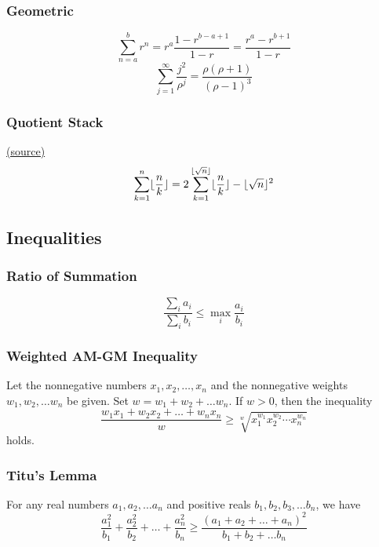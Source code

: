 \documentclass[10pt]{article}
\begin{document}
\subsubsection{Geometric}
\begin{equation}
    \sum_{n=a}^b r^n = r^a \frac{1-r^{b-a+1}}{1-r} = \frac{r^a - r^{b+1}}{1-r}
\end{equation}
\begin{equation}
    \sum_{j=1}^{\infty} \frac{j^2}{\rho^j} = \frac{\rho (\rho+1)}{(\rho-1)^3}
\end{equation}

\subsubsection{Quotient Stack}
\href{https://math.stackexchange.com/questions/384520/efficient-computation-of-sum-k-1n-left-lfloor-fracnk-right-rfloor}{(source)}
\begin{equation}
    \sum_{k=1}^n \lfloor \frac{n}{k} \rfloor = 2 \sum_{k=1}^{\lfloor \sqrt{n} \rfloor} \lfloor \frac{n}{k} \rfloor - \lfloor \sqrt{n} \rfloor^2    
\end{equation}

\subsection{Inequalities}
\subsubsection{Ratio of Summation}
\begin{equation}
    \frac{\sum_i a_i}{\sum_i b_i} \leq \max_i \frac{a_i}{b_i}
\end{equation}

\subsubsection{Weighted AM-GM Inequality}
Let the nonnegative numbers $x_1, x_2, \dots, x_n$ and the nonnegative weights $w_1, w_2, \dots w_n$ be given. Set $w = w_1 + w_2 + \dots w_n$. If $w>0$, then the inequality 
\begin{equation}
    \frac{w_1 x_1 +w_2 x_2 + \dots + w_n x_n}{w} \geq \sqrt[w]{x_1^{w_1}x_2^{w_2} \cdots x_n^{w_n}}
\end{equation}
holds.

\subsubsection{Titu's Lemma}
 For any real numbers $a_1, a_2, \dots a_n$ and positive reals $b_1, b_2, b_3, \dots b_n$, we have
\begin{equation}
    \frac{a_1^2}{b_1} + \frac{a_2^2}{b_2} + \dots + \frac{a_n^2}{b_n} \geq \frac{(a_1 + a_2 + \dots + a_n)^2}{b_1 + b_2 + \dots b_n}
\end{equation}
\end{document}
